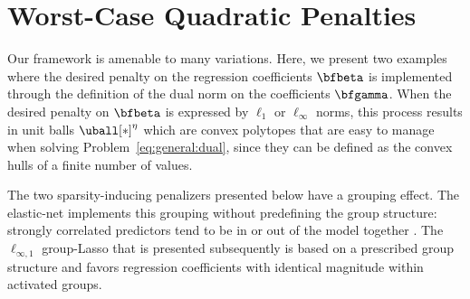 %  


\section{Worst-Case Quadratic Penalties \label{sec:quadra}}
\label{sec:gammaperturb}

Our framework is amenable to many variations.
Here, we present two examples where
the desired penalty on the regression coefficients $\bfbeta$ is implemented 
through the 
definition of the dual norm on the coefficients $\bfgamma$.
When the desired penalty on $\bfbeta$ is expressed by
$\ell_1$ or $\ell_\infty$ norms, this process results in unit balls
$\uball[*]^\eta$ which are convex polytopes that are 
easy to manage when solving Problem~\eqref{eq:general:dual}, since they
can be defined as the convex hulls of a finite number of values.

The two sparsity-inducing penalizers presented below have a grouping effect.
The elastic-net implements this grouping without predefining the group
structure: strongly correlated predictors tend to be in or out of the model
together \citep{2005_JRSS_Zou}.  
The $\ell_{\infty,1}$ group-Lasso that is presented subsequently is based on a
prescribed group structure and favors regression coefficients with identical
magnitude within activated groups.

 

% 



%




%
